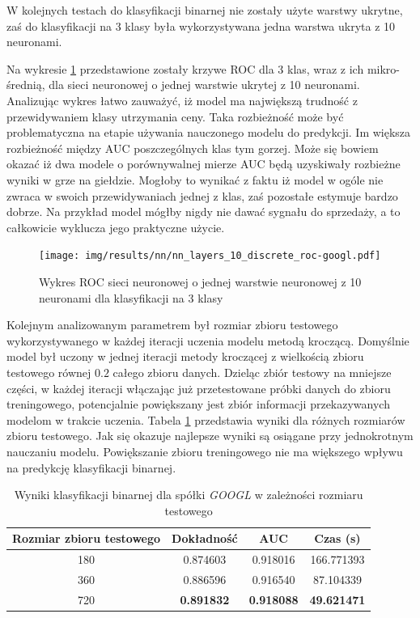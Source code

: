 \documentclass[a4paper, twoside, 11pt, openright]{article}
\begin{document}
W kolejnych testach do klasyfikacji binarnej nie zostały użyte warstwy ukrytne, zaś do klasyfikacji na 3 klasy była wykorzystywana jedna warstwa ukryta z 10 neuronami.

\bigskip

Na wykresie \ref{img:nn_layers_discrete} przedstawione zostały krzywe ROC dla 3 klas, wraz z ich mikro-średnią, dla sieci neuronowej o jednej warstwie ukrytej z 10 neuronami. Analizując wykres łatwo zauważyć, iż model ma największą trudność z przewidywaniem klasy utrzymania ceny. Taka rozbieżność może być problematyczna na etapie używania nauczonego modelu do predykcji. Im większa rozbieżność między AUC poszczególnych klas tym gorzej. Może się bowiem okazać iż dwa modele o porównywalnej mierze AUC będą uzyskiwały rozbieżne wyniki w grze na giełdzie. Mogłoby to wynikać z faktu iż model w ogóle nie zwraca w swoich przewidywaniach jednej z klas, zaś pozostałe estymuje bardzo dobrze. Na przykład model mógłby nigdy nie dawać sygnału do sprzedaży, a to całkowicie wyklucza jego praktyczne użycie. 


\begin{figure}[H]
\centering \texttt{[image: img/results/nn/nn\_layers\_10\_discrete\_roc-googl.pdf]}
\caption{Wykres ROC sieci neuronowej o jednej warstwie neuronowej z 10 neuronami dla klasyfikacji na 3 klasy}
\label{img:nn_layers_discrete}
\end{figure}

\bigskip

Kolejnym analizowanym parametrem był rozmiar zbioru testowego wykorzystywanego w każdej iteracji uczenia modelu metodą kroczącą. Domyślnie model był uczony w jednej iteracji metody kroczącej z wielkością zbioru testowego równej $0.2$ całego zbioru danych. Dzieląc zbiór testowy na mniejsze części, w każdej iteracji włączając już przetestowane próbki danych do zbioru treningowego, potencjalnie powiększany jest zbiór informacji przekazywanych modelom w trakcie uczenia. Tabela \ref{tab:nn_walk_forward_test_binary} przedstawia wyniki dla różnych rozmiarów zbioru testowego. Jak się okazuje najlepsze wyniki są osiągane przy jednokrotnym nauczaniu modelu. Powiększanie zbioru treningowego nie ma większego wpływu na predykcję klasyfikacji binarnej.

\begin{table}[H]
    \centering
    \begin{tabular}{|c|c|c|c|}
    \hline
        \textbf{Rozmiar zbioru testowego} & \textbf{Dokładność} &  \textbf{AUC} &  \textbf{Czas (s)} \\ \hline
180                      &  0.874603 &  0.918016 &  166.771393  \\ \hline
360                         &  0.886596 &  0.916540 &   87.104339  \\ \hline
720                         &  \textbf{0.891832} &  \textbf{0.918088} &   \textbf{49.621471} \\ \hline
    \end{tabular}
    \caption{Wyniki klasyfikacji binarnej dla spółki \textit{GOOGL} w zależności rozmiaru testowego}
    \label{tab:nn_walk_forward_test_binary}
\end{table}
\end{document}
